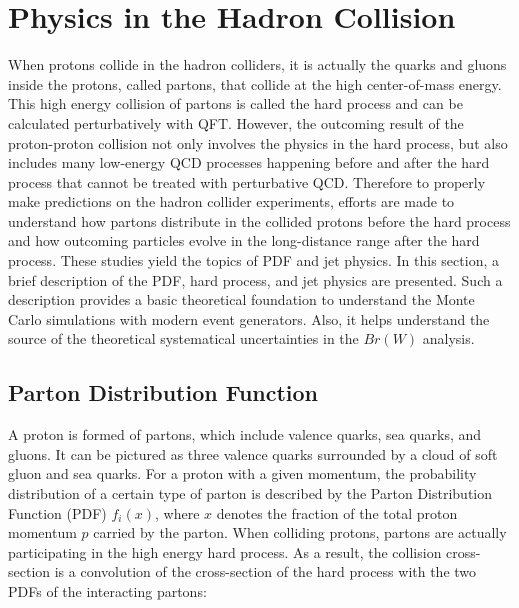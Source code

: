 

\section{Physics in the Hadron Collision}
\label{sec:relatedWorks:ppCollision} 

When protons collide in the hadron colliders, it is actually the quarks and gluons inside the protons, called partons, that collide at the high center-of-mass energy. This high energy collision of partons is called the hard process and can be calculated perturbatively with QFT. However, the outcoming result of the proton-proton collision not only involves the physics in the hard process, but also includes many low-energy QCD processes happening before and after the hard process that cannot be treated with perturbative QCD. Therefore to properly make predictions on the hadron collider experiments, efforts are made to understand how partons distribute in the collided protons before the hard process and how outcoming particles evolve in the long-distance range after the hard process. These studies yield the topics of PDF and jet physics. In this section, a brief description of the PDF, hard process, and jet physics are presented. Such a description provides a basic theoretical foundation to understand the Monte Carlo simulations with modern event generators. Also, it helps understand the source of the theoretical systematical uncertainties in the $Br(W)$ analysis.

\subsection{Parton Distribution Function}
\label{sec:relatedWorks:ppCollision:pdf} 


A proton is formed of partons, which include valence quarks, sea quarks, and gluons. It can be pictured as three valence quarks surrounded by a cloud of soft gluon and sea quarks. For a proton with a given momentum, the probability distribution of a certain type of parton is described by the Parton Distribution Function (PDF) $f_i(x)$, where $x$ denotes the fraction of the total proton momentum $p$ carried by the parton. When colliding protons, partons are actually participating in the high energy hard process. As a result, the collision cross-section is a convolution of the cross-section of the hard process with the two PDFs of the interacting partons:

